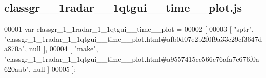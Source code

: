 \subsection{classgr\+\_\+\_\+1radar\+\_\+\_\+1qtgui\+\_\+\+\_\+time\+\_\+\+\_\+plot.\+js}
\label{classgr__1__1radar__1__1qtgui____time____plot_8js_source}

\begin{DoxyCode}
00001 var classgr_1_1radar_1_1qtgui__time__plot =
00002 [
00003     [ \textcolor{stringliteral}{"sptr"}, \textcolor{stringliteral}{"classgr\_1\_1radar\_1\_1qtgui\_\_time\_\_plot.html#afb0d07e2b2f0f9a33c29cf3647da870a"}, null ],
00004     [ \textcolor{stringliteral}{"make"}, \textcolor{stringliteral}{"classgr\_1\_1radar\_1\_1qtgui\_\_time\_\_plot.html#a9557415cc566c76afa7c676f0a620aab"}, null ]
00005 ];
\end{DoxyCode}
